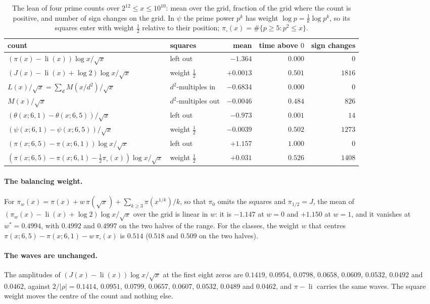 \documentclass[11pt]{article}
\theoremstyle{definition}\newtheorem{definition}[theorem]{Definition}
\theoremstyle{remark}\newtheorem{remark}[theorem]{Remark}
\theoremstyle{definition}\newtheorem{axiom}{Axiom}
\newcommand{\li}{\operatorname{li}}\newcommand{\Tr}{\operatorname{Tr}}
\begin{document}
\begin{table}[!htbp]\centering\small
\setlength{\tabcolsep}{4pt}
\begin{tabular}{@{}llrrr@{}}\toprule
count & squares & mean & time above $0$ & sign changes\\\midrule
$(\pi(x)-\li(x))\log x/\sqrt x$ & left out & $-1.364$ & $0.000$ & $0$\\
$(J(x)-\li(x)+\log2)\log x/\sqrt x$ & weight $\frac12$ & $+0.0013$ & $0.501$ & $1816$\\[2pt]
$L(x)/\sqrt x=\sum_dM(x/d^2)/\sqrt x$ & $d^2$-multiples in & $-0.6834$ & $0.000$ & $0$\\
$M(x)/\sqrt x$ & $d^2$-multiples out & $-0.0046$ & $0.484$ & $826$\\[2pt]
$(\theta(x;6,1)-\theta(x;6,5))/\sqrt x$ & left out & $-0.973$ & $0.001$ & $14$\\
$(\psi(x;6,1)-\psi(x;6,5))/\sqrt x$ & weight $\frac12$ & $-0.0039$ & $0.502$ & $1273$\\[2pt]
$(\pi(x;6,5)-\pi(x;6,1))\log x/\sqrt x$ & left out & $+1.157$ & $1.000$ & $0$\\
$(\pi(x;6,5)-\pi(x;6,1)-\frac12\pi_\square(x))\log x/\sqrt x$ & weight $\frac12$ & $+0.031$ & $0.526$ & $1408$\\\bottomrule
\end{tabular}
\caption{The lean of four prime counts over $2^{12}\le x\le10^{10}$: mean over the grid, fraction of the grid where the count is positive, and number of sign changes on the grid. In $\psi$ the prime power $p^k$ has weight $\log p=\frac1k\log p^k$, so its squares enter with weight $\frac12$ relative to their position; $\pi_\square(x)=\#\{p\ge5:p^2\le x\}$.}\label{tab:lean}
\end{table}

\paragraph{The balancing weight.} For $\pi_w(x)=\pi(x)+w\,\pi(\sqrt x)+\sum_{k\ge3}\pi(x^{1/k})/k$, so that $\pi_0$ omits the squares and $\pi_{1/2}=J$, the mean of $(\pi_w(x)-\li(x)+\log2)\log x/\sqrt x$ over the grid is linear in $w$: it is $-1.147$ at $w=0$ and $+1.150$ at $w=1$, and it vanishes at $w^*=0.4994$, with $0.4992$ and $0.4997$ on the two halves of the range.
For the classes, the weight $w$ that centres $\pi(x;6,5)-\pi(x;6,1)-w\,\pi_\square(x)$ is $0.514$ ($0.518$ and $0.509$ on the two halves).

\paragraph{The waves are unchanged.} The amplitudes of $(J(x)-\li(x))\log x/\sqrt x$ at the first eight zeros are $0.1419$, $0.0954$, $0.0798$, $0.0658$, $0.0609$, $0.0532$, $0.0492$ and $0.0462$, against $2/|\rho|=0.1414$, $0.0951$, $0.0799$, $0.0657$, $0.0607$, $0.0532$, $0.0489$ and $0.0462$, and $\pi-\li$ carries the same waves. The square weight moves the centre of the count and nothing else.
\end{document}
